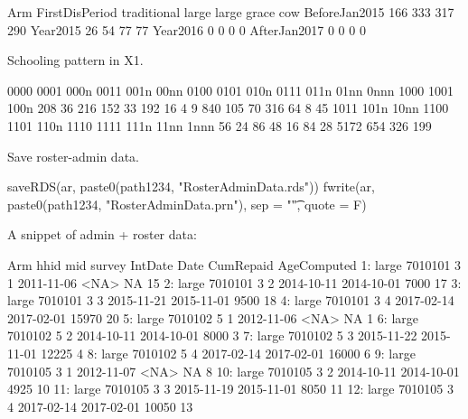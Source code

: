 \begin{Schunk}
\begin{Soutput}
               Arm
FirstDisPeriod  traditional large large grace cow
  BeforeJan2015         166   333         317 290
  Year2015               26    54          77  77
  Year2016                0     0           0   0
  AfterJan2017            0     0           0   0
\end{Soutput}
\end{Schunk}
Schooling pattern in X1.
\begin{Schunk}
\begin{Soutput}

0000 0001 000n 0011 001n 00nn 0100 0101 010n 0111 011n 01nn 0nnn 1000 1001 100n 
 208   36  216  152   33  192   16    4    9  840  105   70  316   64    8   45 
1011 101n 10nn 1100 1101 110n 1110 1111 111n 11nn 1nnn 
  56   24   86   48   16   84   28 5172  654  326  199 
\end{Soutput}
\end{Schunk}
Save roster-admin data.
\begin{Schunk}
\begin{Sinput}
saveRDS(ar, paste0(path1234, "RosterAdminData.rds"))
fwrite(ar, paste0(path1234, "RosterAdminData.prn"), sep = "\t", quote = F)
\end{Sinput}
\end{Schunk}
A snippet of \textsf{admin + roster} data:
\begin{Schunk}
\begin{Soutput}
      Arm    hhid mid survey    IntDate       Date CumRepaid AgeComputed
 1: large 7010101   3      1 2011-11-06       <NA>        NA          15
 2: large 7010101   3      2 2014-10-11 2014-10-01      7000          17
 3: large 7010101   3      3 2015-11-21 2015-11-01      9500          18
 4: large 7010101   3      4 2017-02-14 2017-02-01     15970          20
 5: large 7010102   5      1 2012-11-06       <NA>        NA           1
 6: large 7010102   5      2 2014-10-11 2014-10-01      8000           3
 7: large 7010102   5      3 2015-11-22 2015-11-01     12225           4
 8: large 7010102   5      4 2017-02-14 2017-02-01     16000           6
 9: large 7010105   3      1 2012-11-07       <NA>        NA           8
10: large 7010105   3      2 2014-10-11 2014-10-01      4925          10
11: large 7010105   3      3 2015-11-19 2015-11-01      8050          11
12: large 7010105   3      4 2017-02-14 2017-02-01     10050          13
\end{Soutput}
\end{Schunk}
